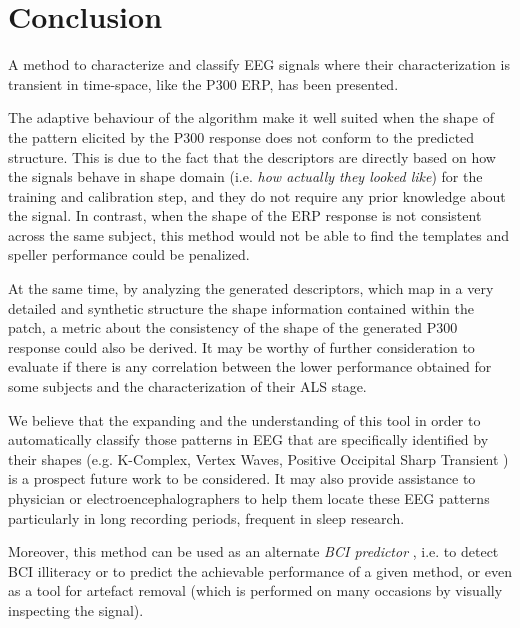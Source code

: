 \documentclass[entropy,article,submit,moreauthors,pdftex,10pt,a4paper]{mdpi}
\begin{document}
\section{Conclusion}

A method to characterize and classify EEG signals where their characterization is transient in time-space, like the P300 ERP, has been presented.   


The adaptive behaviour of the algorithm make it well suited when the shape of the pattern elicited by the P300 response does not conform to the predicted structure.  This is due to the fact that the descriptors are directly based on how the signals behave in shape domain (i.e. \textit{how actually they looked like}) for the training and calibration step, and they do not require any prior knowledge about the signal.   In contrast, when the shape of the ERP response is not consistent across the same subject, this method would not be able to find the templates and speller performance could be penalized.  

At the same time, by analyzing the generated descriptors, which map in a very detailed and synthetic structure the shape information contained within the patch, a metric about the consistency of the shape of the generated P300 response could also be derived.  It may be worthy of further consideration to evaluate if there is any correlation between the lower performance obtained for some subjects and the characterization of their ALS stage.

We believe that the expanding and the understanding of this tool in order to automatically classify those patterns in EEG that are specifically identified by their shapes (e.g. K-Complex, Vertex Waves, Positive Occipital Sharp Transient \citep{Hartman2005}) is a prospect future work to be considered.  It may also provide  assistance to physician or electroencephalographers to help them locate these EEG patterns particularly in long recording periods, frequent in sleep research.

Moreover, this method can be used as an alternate \textit{BCI predictor} \citep{Clerc}, i.e. to detect BCI illiteracy or to predict the achievable performance of a given method, or even as a tool for artefact removal (which is performed on many occasions by visually inspecting the signal).
\end{document}

